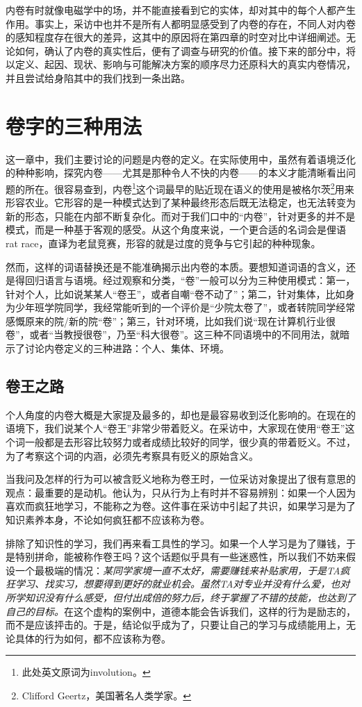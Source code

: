 \documentclass[UTF8,a4paper,fontset=windows,11pt,openany]{ctexbook}
\begin{document}
内卷有时就像电磁学中的场，并不能直接看到它的实体，却对其中的每个人都产生作用。事实上，采访中也并不是所有人都明显感受到了内卷的存在，不同人对内卷的感知程度存在很大的差异，这其中的原因将在第四章的时空对比中详细阐述。无论如何，确认了内卷的真实性后，便有了调查与研究的价值。接下来的部分中，将以定义、起因、现状、影响与可能解决方案的顺序尽力还原科大的真实内卷情况，并且尝试给身陷其中的我们找到一条出路。

\chapter{卷字的三种用法}
这一章中，我们主要讨论的问题是内卷的定义。在实际使用中，虽然有着语境泛化的种种影响，探究内卷——尤其是那种令人不快的内卷——的本义才能清晰看出问题的所在。很容易查到，内卷\footnote{此处英文原词为involution。}这个词最早的贴近现在语义的使用是被格尔茨\footnote{Clifford Geertz，美国著名人类学家。}用来形容农业。它形容的是一种模式达到了某种最终形态后既无法稳定，也无法转变为新的形态，只能在内部不断复杂化。而对于我们口中的“内卷”，针对更多的并不是模式，而是一种基于客观的感受。从这个角度来说，一个更合适的名词会是俚语rat race，直译为老鼠竞赛，形容的就是过度的竞争与它引起的种种现象。

然而，这样的词语替换还是不能准确揭示出内卷的本质。要想知道词语的含义，还是得回归语言与语境。经过观察和分类，“卷”一般可以分为三种使用模式：第一，针对个人，比如说某某人“卷王”，或者自嘲“卷不动了”；第二，针对集体，比如身为少年班学院同学，我经常能听到的一个评价是“少院太卷了”，或者转院同学经常感慨原来的院/新的院“卷”；第三，针对环境，比如我们说“现在计算机行业很卷”，或者“当教授很卷”，乃至“科大很卷”。这三种不同语境中的不同用法，就暗示了讨论内卷定义的三种进路：个人、集体、环境。

\section{卷王之路}
个人角度的内卷大概是大家提及最多的，却也是最容易收到泛化影响的。在现在的语境下，我们说某个人“卷王”非常少带着贬义。在采访中，大家现在使用“卷王”这个词一般都是去形容比较努力或者成绩比较好的同学，很少真的带着贬义。不过，为了考察这个词的内涵，必须先考察具有贬义的原始含义。

当我问及怎样的行为可以被含贬义地称为卷王时，一位采访对象提出了很有意思的观点：最重要的是动机。他认为，只从行为上有时并不容易辨别：如果一个人因为喜欢而疯狂地学习，不能称之为卷。这件事在采访中引起了共识，如果学习是为了知识素养本身，不论如何疯狂都不应该称为卷。

排除了知识性的学习，我们再来看工具性的学习。如果一个人学习是为了赚钱，于是特别拼命，能被称作卷王吗？这个话题似乎具有一些迷惑性，所以我们不妨来假设一个最极端的情况：\emph{某同学家境一直不太好，需要赚钱来补贴家用，于是TA疯狂学习、找实习，想要得到更好的就业机会。虽然TA对专业并没有什么爱，也对所学知识没有什么感受，但付出成倍的努力后，终于掌握了不错的技能，也达到了自己的目标。}在这个虚构的案例中，道德本能会告诉我们，这样的行为是励志的，而不是应该抨击的。于是，结论似乎成为了，只要让自己的学习与成绩能用上，无论具体的行为如何，都不应该称为卷。
\end{document}
